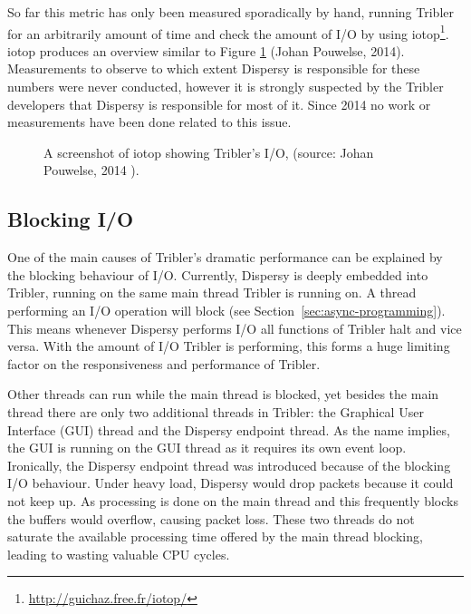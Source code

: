So far this metric has only been measured sporadically by hand, running Tribler for an arbitrarily amount of time and check the amount of I/O by using iotop\footnote{\url{http://guichaz.free.fr/iotop/}}.
iotop produces an overview similar to Figure \ref{fig:iotop_tribler_april_2014} (Johan Pouwelse, 2014).
Measurements to observe to which extent Dispersy is responsible for these numbers were never conducted, however it is strongly suspected by the Tribler developers that Dispersy is responsible for most of it.
Since 2014 no work or measurements have been done related to this issue.

\begin{figure}[!h]
	\caption{A screenshot of iotop showing Tribler's I/O, (source: Johan Pouwelse, 2014 \cite{pouwelse2014reduce}).}
	\label{fig:iotop_tribler_april_2014}
\end{figure}

\subsection{Blocking I/O}
One of the main causes of Tribler's dramatic performance can be explained by the blocking behaviour of I/O.
Currently, Dispersy is deeply embedded into Tribler, running on the same main thread Tribler is running on.
A thread performing an I/O operation will block (see Section~\ref{sec:async-programming}).
This means whenever Dispersy performs I/O all functions of Tribler halt and vice versa.
With the amount of I/O Tribler is performing, this forms a huge limiting factor on the responsiveness and performance of Tribler.

Other threads can run while the main thread is blocked, yet besides the main thread there are only two additional threads in Tribler: the Graphical User Interface (GUI) thread and the Dispersy endpoint thread.
As the name implies, the GUI is running on the GUI thread as it requires its own event loop.
Ironically, the Dispersy endpoint thread was introduced because of the blocking I/O behaviour.
Under heavy load, Dispersy would drop packets because it could not keep up.
As processing is done on the main thread and this frequently blocks the buffers would overflow, causing packet loss.
These two threads do not saturate the available processing time offered by the main thread blocking, leading to wasting valuable CPU cycles.

